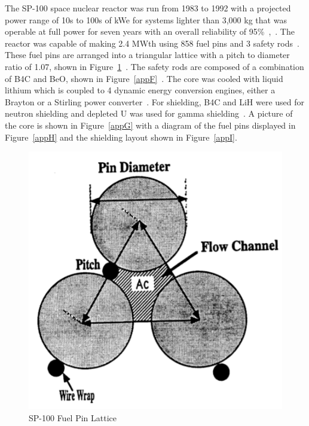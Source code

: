 \documentclass{article}
\begin{document}
The SP-100 space nuclear reactor was run from 1983 to 1992 with a projected power range of 10s to 100s of kWe for systems lighter than 3,000 kg that was operable at full power for seven years with an overall reliability of 95\%~\cite{borgesprimary},~\cite{anderson1983power}. The reactor was capable of making 2.4 MWth using 858 fuel pins and 3 safety rods~\cite{demuth2003sp100}. These fuel pins are arranged into a triangular lattice with a pitch to diameter ratio of 1.07, shown in Figure~\ref{appE}~\cite{el1992decay}. The safety rods are composed of a combination of B4C and BeO, shown in Figure~\ref{appF}~\cite{demuth2003sp100}. The core was cooled with liquid lithium which is coupled to 4 dynamic energy conversion engines, either a Brayton or a Stirling power converter~\cite{el1992decay}. For shielding, B4C and LiH were used for neutron shielding and depleted U was used for gamma shielding~\cite{demuth2003sp100}. A picture of the core is shown in Figure~\ref{appG} with a diagram of the fuel pins displayed in Figure~\ref{appH} and the shielding layout shown in Figure~\ref{appI}.


\begin{figure}[]
	\centering
	\includegraphics[height=0.45\textheight]{fig/appE}
	\caption[SP-100 Fuel Pin Lattice]{SP-100 Fuel Pin Lattice~\cite{el1992decay}}
	\label{appE}
\end{figure}
\end{document}
